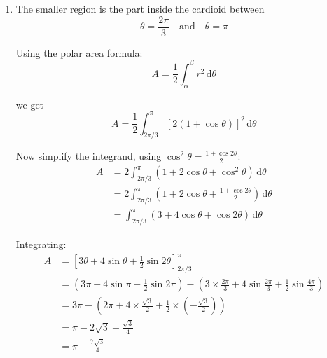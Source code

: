 \documentclass[leqno]{article}
\begin{document}
\begin{enumerate}[
	  label=\textbf{\arabic*.},
	  leftmargin=*,
	  topsep=0pt,
	  partopsep=0pt,
	  parsep=0pt
	]
\begin{djsSolution}
\begin{enumerate}[label=\textbf{(\alph*)}]

	\(C_1\) is a cardioid, symmetric about the initial line, with \(r=4\) at \(\theta=0\) and a cusp at the pole at \(\theta=\pi\). \(C_2\) is the half-line from the pole at angle \(\frac{2\pi}{3}\) to the initial line. Substituting \(\theta=\frac{2\pi}{3}\) into \(C_1\):
	\[
	r=2\left(1+\cos\frac{2\pi}{3}\right)=2\left(1-\frac12\right)=1
	\]

	So the curves meet at the pole and at the point with polar coordinates \(\left(1,\frac{2\pi}{3}\right)\).

	  \item The smaller region is the part inside the cardioid between
	\[
	\theta=\frac{2\pi}{3}\quad \text{and}\quad \theta=\pi
	\]
	
	Using the polar area formula:
	\[
	A=\frac12\int_{\alpha}^{\beta} r^2\,\mathrm{d}\theta
	\]

	we get
	\[
	A=\frac12\int_{2\pi/3}^{\pi}\left[2(1+\cos\theta)\right]^2\,\mathrm{d}\theta
	\]
	
	Now simplify the integrand, using \(\cos^2\theta=\frac{1+\cos 2\theta}{2}\):
	\begin{align*}
	A&=2\int_{2\pi/3}^{\pi}(1+2\cos\theta+\cos^2\theta)\,\mathrm{d}\theta \\
	&=2\int_{2\pi/3}^{\pi}\left(1+2\cos\theta+\frac{1+\cos2\theta}{2}\right)\,\mathrm{d}\theta \\
	&=\int_{2\pi/3}^{\pi}(3+4\cos\theta+\cos2\theta)\,\mathrm{d}\theta
	\end{align*}
	
	Integrating:
	\begin{align*}
	A&=\left[3\theta+4\sin\theta+\frac12\sin2\theta\right]_{2\pi/3}^{\pi} \\
	&=\left(3\pi+4\sin\pi+\frac12\sin2\pi\right)
	-\left(3\times\frac{2\pi}{3}+4\sin\frac{2\pi}{3}+\frac12\sin\frac{4\pi}{3}\right) \\
	&=3\pi-\left(2\pi+4\times\frac{\sqrt3}{2}+\frac12\times\left(-\frac{\sqrt3}{2}\right)\right) \\
	&=\pi-2\sqrt3+\frac{\sqrt3}{4} \\
	&=\pi-\frac{7\sqrt3}{4}
	\end{align*}
	

\end{enumerate}
\end{djsSolution}
\end{enumerate}
\end{document}
